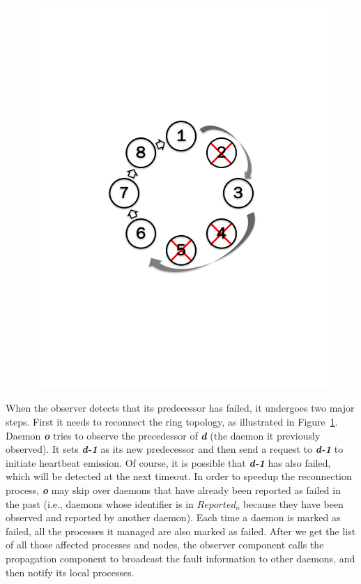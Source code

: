 \documentclass[sigconf]{acmart}
\begin{document}
\begin{figure}[h]
\begin{minipage}[t]{.22\textwidth}
  \includegraphics[trim=3cm 8.0cm 3cm 8cm,width=\linewidth]{reconnet_cross.pdf}
  \label{fig:ReconnectRing}
\end{minipage}
\end{figure}

When the observer detects that its predecessor has failed, it undergoes two major steps.
First it needs to reconnect the ring topology, as illustrated in Figure~\ref{fig:ReconnectRing}. Daemon \textbf{\textit{o}} tries to 
observe the precedessor of \textbf{\textit{d}} (the daemon it previously observed). 
It sets \textbf{\textit{d-1}} as its new predecessor and then send a request to \textbf{\textit{d-1}} to initiate heartbeat emission. Of course, 
it is possible that \textbf{\textit{d-1}} has also failed, which will be detected at the next timeout. In order 
to speedup the reconnection process, \textbf{\textit{o}} may skip over 
daemons that have already been reported as failed in the past (i.e., daemons
whose identifier is in $Reported_o$ because they have been observed and reported 
by another daemon). Each time a daemon is marked as failed, all the processes it 
managed are also marked as failed. After we get the list of all those affected processes and nodes, the observer component calls the propagation component to broadcast the fault information to other daemons, and then notify its local processes.
 
\end{document}
